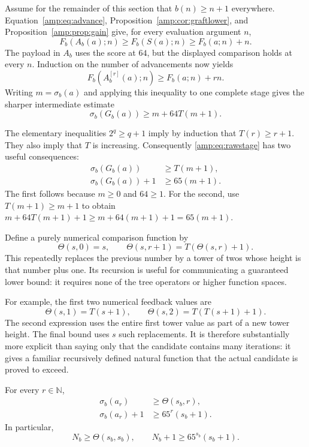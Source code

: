 Assume for the remainder of this section that $b(n)\geq n+1$ everywhere.
Equation~\eqref{amp:eq:advance}, Proposition~\ref{amp:cor:graftlower}, and
Proposition~\ref{amp:prop:gain} give, for every evaluation argument $n$,
\begin{equation}
 F_b(A_b(a);n)\geq F_b(S(a);n)\geq F_b(a;n)+n.
 \label{amp:eq:advancegain}
\end{equation}
The payload in $A_b$ uses the score at $64$, but the displayed comparison
holds at every $n$.  Induction on the number of advancements now yields
\[
 F_b(A_b^{[r]}(a);n)\geq F_b(a;n)+rn.
\]
Writing $m=\sigma_b(a)$ and applying this inequality to one complete stage
gives the sharper intermediate estimate
\begin{equation}
 \sigma_b(G_b(a))\geq m+64T(m+1).
 \label{amp:eq:rawstage}
\end{equation}

The elementary inequalities $2^q\geq q+1$ imply by induction that
$T(r)\geq r+1$.  They also imply that $T$ is increasing.  Consequently
\eqref{amp:eq:rawstage} has two useful consequences:
\begin{align}
 \sigma_b(G_b(a))&\geq T(m+1),
 \label{amp:eq:stage-tower}\\
 \sigma_b(G_b(a))+1&\geq65(m+1).
 \label{amp:eq:stage-scale}
\end{align}
The first follows because $m\geq0$ and $64\geq1$.  For the second, use
$T(m+1)\geq m+1$ to obtain
$m+64T(m+1)+1\geq m+64(m+1)+1=65(m+1)$.

Define a purely numerical comparison function by
\[
 \Theta(s,0)=s,\qquad
 \Theta(s,r+1)=T(\Theta(s,r)+1).
\]
This repeatedly replaces the previous number by a tower of twos whose
height is that number plus one.  Its recursion is useful for communicating
a guaranteed lower bound: it requires none of the tree operators or higher
function spaces.

For example, the first two numerical feedback values are
\[
 \Theta(s,1)=T(s+1),\qquad
 \Theta(s,2)=T(T(s+1)+1).
\]
The second expression uses the entire first tower value as part of a new
tower height.  The final bound uses $s$ such replacements.  It is therefore
substantially more explicit than saying only that the candidate contains
many iterations: it gives a familiar recursively defined natural function
that the actual candidate is proved to exceed.

\begin{theorem}
\label{amp:thm:quantitative}
For every $r\in\mathbb N$,
\begin{align*}
 \sigma_b(a_r)&\geq\Theta(s_b,r),\\
 \sigma_b(a_r)+1&\geq65^r(s_b+1).
\end{align*}
In particular,
\[
 \boxed{N_b\geq\Theta(s_b,s_b)},\qquad
 \boxed{N_b+1\geq65^{s_b}(s_b+1)}.
\]
\end{theorem}

